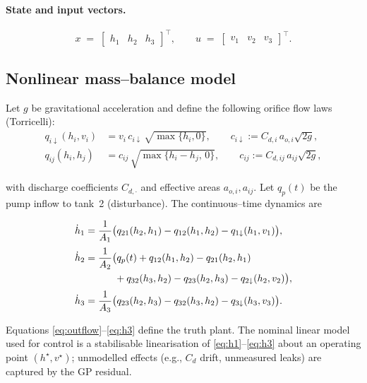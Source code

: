 \documentclass[10pt]{article}
\newcommand{\1}{\mathbbm{1}}
\begin{document}
\paragraph*{State and input vectors.}
\[
x \;=\; \begin{bmatrix} h_1 & h_2 & h_3 \end{bmatrix}^\top,\qquad
u \;=\; \begin{bmatrix} v_1 & v_2 & v_3 \end{bmatrix}^\top.
\]

\subsection{Nonlinear mass–balance model}\label{subsec:nonlinear_model}
Let \(g\) be gravitational acceleration and define the following orifice flow laws (Torricelli):
\begin{align}
q_{i\downarrow}(h_i,v_i) &= v_i\, c_{i\downarrow}\,\sqrt{\max\{h_i,0\}}, \qquad c_{i\downarrow} := C_{d,i}\,a_{o,i}\sqrt{2g}, \label{eq:outflow}\\
q_{ij}(h_i,h_j) &= c_{ij}\,\sqrt{\max\{h_i-h_j,\,0\}}, \qquad c_{ij} := C_{d,ij}\,a_{ij}\sqrt{2g}, \label{eq:interflow}
\end{align}

with discharge coefficients \(C_{d,\cdot}\) and effective areas \(a_{o,i},a_{ij}\).
Let \(q_p(t)\) be the pump inflow to tank~2 (disturbance). The continuous–time dynamics are

\begin{align}
\dot h_1 &= \frac{1}{A_1}\big( q_{21}(h_2,h_1) - q_{12}(h_1,h_2)
            - q_{1\downarrow}(h_1,v_1) \big), \label{eq:h1}\\[2pt]
\dot h_2 &= \frac{1}{A_2}\big( q_p(t) + q_{12}(h_1,h_2) - q_{21}(h_2,h_1) \notag\\
        &\qquad\quad {}+ q_{32}(h_3,h_2) - q_{23}(h_2,h_3)
            - q_{2\downarrow}(h_2,v_2) \big), \label{eq:h2}\\[2pt]
\dot h_3 &= \frac{1}{A_3}\big( q_{23}(h_2,h_3) - q_{32}(h_3,h_2)
            - q_{3\downarrow}(h_3,v_3) \big). \label{eq:h3}
\end{align}

Equations \eqref{eq:outflow}–\eqref{eq:h3} define the truth plant. The nominal linear model used for control is a stabilisable linearisation of \eqref{eq:h1}–\eqref{eq:h3} about an operating point \((h^\star,v^\star)\); unmodelled effects (e.g., \(C_d\) drift, unmeasured leaks) are captured by the GP residual.
\end{document}
